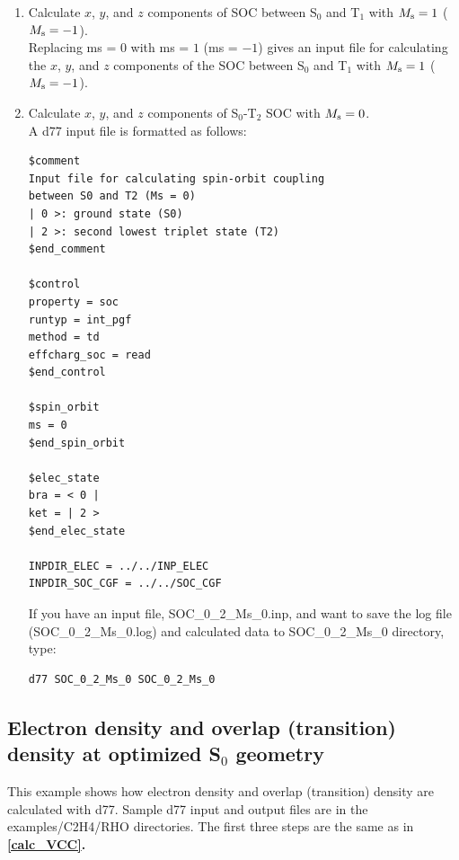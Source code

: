 ﻿\documentclass[11pt,a4paper,openany]{article}
\begin{document}
\begin{enumerate}
\item{
Calculate $x$, $y$, and $z$ components of SOC between S$_0$ and T$_1$ with $M_{\rm{s}} =1$ ($M_{\rm{s}} = -1$).\\
Replacing ms = $0$ with ms = $1$ (ms = $-1$) gives an input file for calculating the $x$, $y$, and $z$ components of the SOC between S$_0$ and T$_1$ with $M_{\rm{s}} = 1$ ($M_{\rm{s}} = -1$).
}

\item{
Calculate $x$, $y$, and $z$ components of S$_0$-T$_2$ SOC with $M_{\rm{s}} = 0$.\\
A d77 input file is formatted as follows:
\begin{verbatim} 
$comment
Input file for calculating spin-orbit coupling
between S0 and T2 (Ms = 0)
| 0 >: ground state (S0)
| 2 >: second lowest triplet state (T2)
$end_comment

$control
property = soc
runtyp = int_pgf
method = td
effcharg_soc = read
$end_control

$spin_orbit
ms = 0
$end_spin_orbit

$elec_state
bra = < 0 |
ket = | 2 >
$end_elec_state

INPDIR_ELEC = ../../INP_ELEC
INPDIR_SOC_CGF = ../../SOC_CGF
\end{verbatim}
If you have an input file, SOC\_0\_2\_Ms\_0.inp, and want to save the log file (SOC\_0\_2\_Ms\_0.log) and calculated data to SOC\_0\_2\_Ms\_0 directory, type:
\begin{verbatim} 
d77 SOC_0_2_Ms_0 SOC_0_2_Ms_0
\end{verbatim}
}

\end{enumerate}

\subsection{Electron density and overlap (transition) density at optimized S$_0$ geometry}
This example shows how electron density and overlap (transition) density are calculated with d77. 
Sample d77 input and output files are in the examples/C2H4/RHO directories. The first three steps are the same as in \bf{\ref{calc_VCC}}\rm{.}
\end{document}
